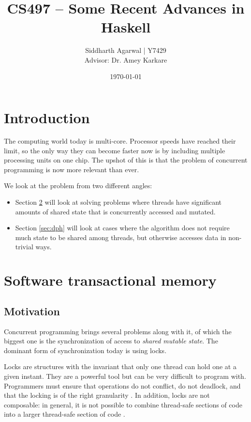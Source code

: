 \documentclass[a4paper]{acmtrans2m}
\title{CS497 -- Some Recent Advances in Haskell}
\author{Siddharth Agarwal | Y7429\\
  Advisor: Dr. Amey Karkare}
\date{\today}
\begin{document}
\maketitle

\tableofcontents

\section{Introduction}
The computing world today is multi-core. Processor speeds have reached their
limit, so the only way they can become faster now is by including multiple
processing units on one chip. The upshot of this is that the problem of
concurrent programming is now more relevant than ever.

We look at the problem from two different angles:
\begin{itemize}
\item Section \ref{sec:stm} will look at solving problems where threads have
  significant amounts of shared state that is concurrently accessed and mutated.
\item Section \ref{sec:dph} will look at cases where the algorithm does not
  require much state to be shared among threads, but otherwise accesses data in
  non-trivial ways.
\end{itemize}

\section{Software transactional memory}
\label{sec:stm}

\subsection{Motivation}

Concurrent programming brings several problems along with it, of which the
biggest one is the synchronization of access to \textit{shared mutable
  state}. The dominant form of synchronization today is using locks.

Locks are structures with the invariant that only one thread can hold one at
a given instant. They are a powerful tool but can be very difficult to program
with. Programmers must ensure that operations do not conflict, do not deadlock,
and that the locking is of the right granularity \cite{Duffy:2010}. In addition,
locks are not composable: in general, it is not possible to combine thread-safe
sections of code into a larger thread-safe section of code \cite{Harris:2005}.
\end{document}
